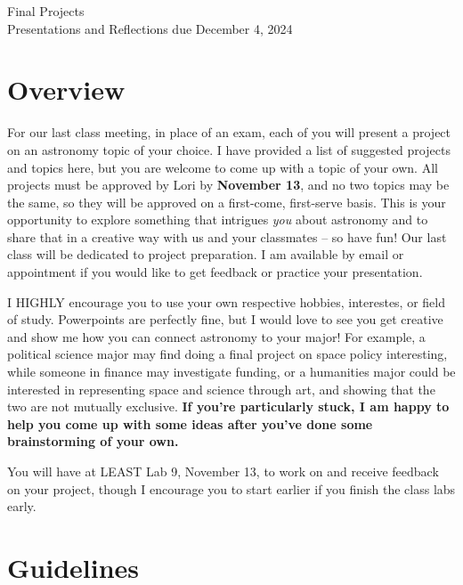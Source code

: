 \documentclass[11pt]{article}
\begin{document}
\begin{center}
\huge{Final Projects}\\ \medskip \Large{Presentations and Reflections due December 4, 2024}
\end{center}

\section{Overview}
For our last class meeting, in place of an exam, each of you will present a project on an astronomy topic of your choice.  I have provided a list of suggested projects and topics here, but you are welcome to come up with a topic of your own.  All projects must be approved by Lori by \textbf{November 13}, and no two topics may be the same, so they will be approved on a first-come, first-serve basis.  This is your opportunity to explore something that intrigues \textit{you} about astronomy and to share that in a creative way with us and your classmates -- so have fun!  Our last class will be dedicated to project preparation. I am available by email or appointment if you would like to get feedback or practice your presentation.

I HIGHLY encourage you to use your own respective hobbies, interestes, or field of study. Powerpoints are perfectly fine, but I would love to see you get creative and show me how you can connect astronomy to your major! For example, a political science major may find doing a final project on space policy interesting, while someone in finance may investigate funding, or a humanities major could be interested in representing space and science through art, and showing that the two are not mutually exclusive. \textbf{If you're particularly stuck, I am happy to help you come up with some ideas after you've done some brainstorming of your own.}

You will have at LEAST Lab 9, November 13, to work on and receive feedback on your project, though I encourage you to start earlier if you finish the class labs early.

\section{Guidelines}
\end{document}
